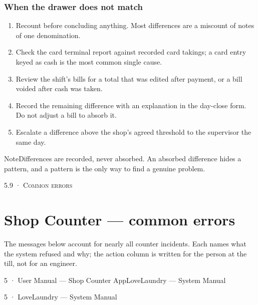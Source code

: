 \documentclass[11pt,a4paper,oneside]{book}
\begin{document}
\subsubsection*{When the drawer does not match}
\begin{enumerate}
\item Recount before concluding anything. Most differences are a miscount of notes of one denomination.
\item Check the card terminal report against recorded card takings; a card entry keyed as cash is the most common single cause.
\item Review the shift's bills for a total that was edited after payment, or a bill voided after cash was taken.
\item Record the remaining difference with an explanation in the day-close form. Do not adjust a bill to absorb it.
\item Escalate a difference above the shop's agreed threshold to the supervisor the same day.
\end{enumerate}
\begin{notebox}NoteDifferences are recorded, never absorbed. An absorbed difference hides a pattern, and a pattern is the only way to find a genuine problem.\end{notebox}
\textsc{\small\color{crimson}5.9 · Common errors}\par\medskip
\section*{Shop Counter — common errors}
The messages below account for nearly all counter incidents. Each names what the system refused and why; the action column is written for the person at the till, not for an engineer.

5 · User Manual — Shop Counter AppLoveLaundry — System Manual

5 · LoveLaundry — System Manual
\end{document}
